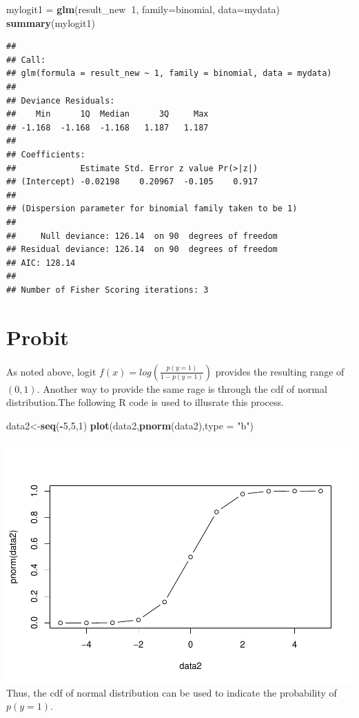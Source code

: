 \documentclass[]{book}
\newenvironment{Shaded}{\begin{snugshade}}{\end{snugshade}}
\newcommand{\KeywordTok}[1]{\textcolor[rgb]{0.13,0.29,0.53}{\textbf{#1}}}
\newcommand{\DataTypeTok}[1]{\textcolor[rgb]{0.13,0.29,0.53}{#1}}
\newcommand{\DecValTok}[1]{\textcolor[rgb]{0.00,0.00,0.81}{#1}}
\newcommand{\StringTok}[1]{\textcolor[rgb]{0.31,0.60,0.02}{#1}}
\newcommand{\OperatorTok}[1]{\textcolor[rgb]{0.81,0.36,0.00}{\textbf{#1}}}
\newcommand{\NormalTok}[1]{#1}
\begin{document}
\begin{Shaded}
\begin{Highlighting}[]
\NormalTok{mylogit1 =}\StringTok{ }\KeywordTok{glm}\NormalTok{(result_new}\OperatorTok{~}\DecValTok{1}\NormalTok{, }\DataTypeTok{family=}\NormalTok{binomial, }\DataTypeTok{data=}\NormalTok{mydata)}
\KeywordTok{summary}\NormalTok{(mylogit1)}
\end{Highlighting}
\end{Shaded}

\begin{verbatim}
## 
## Call:
## glm(formula = result_new ~ 1, family = binomial, data = mydata)
## 
## Deviance Residuals: 
##    Min      1Q  Median      3Q     Max  
## -1.168  -1.168  -1.168   1.187   1.187  
## 
## Coefficients:
##             Estimate Std. Error z value Pr(>|z|)
## (Intercept) -0.02198    0.20967  -0.105    0.917
## 
## (Dispersion parameter for binomial family taken to be 1)
## 
##     Null deviance: 126.14  on 90  degrees of freedom
## Residual deviance: 126.14  on 90  degrees of freedom
## AIC: 128.14
## 
## Number of Fisher Scoring iterations: 3
\end{verbatim}

\section{Probit}\label{probit}

As noted above, logit \(f(x)=log(\frac{p(y=1)}{1-p(y=1)})\) provides the
resulting range of \((0,1)\). Another way to provide the same rage is
through the cdf of normal distribution.The following R code is used to
illusrate this process.

\begin{Shaded}
\begin{Highlighting}[]
\NormalTok{data2<-}\KeywordTok{seq}\NormalTok{(}\OperatorTok{-}\DecValTok{5}\NormalTok{,}\DecValTok{5}\NormalTok{,}\DecValTok{1}\NormalTok{)}
\KeywordTok{plot}\NormalTok{(data2,}\KeywordTok{pnorm}\NormalTok{(data2),}\DataTypeTok{type =} \StringTok{"b"}\NormalTok{)}
\end{Highlighting}
\end{Shaded}

\includegraphics{bookdown-demo_files/figure-latex/unnamed-chunk-3-1.pdf}
Thus, the cdf of normal distribution can be used to indicate the
probability of \(p(y=1)\).
\end{document}
